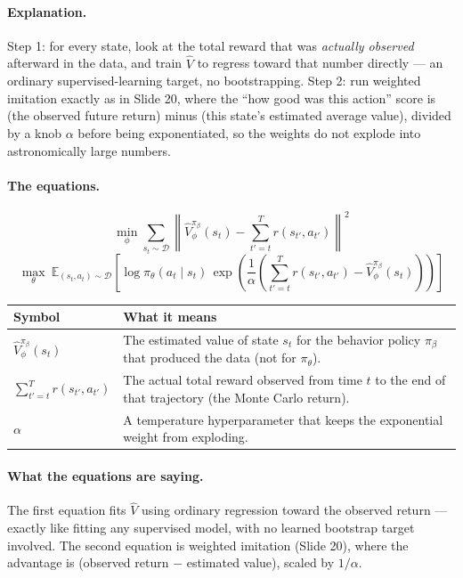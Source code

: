 \documentclass[11pt]{article}
\begin{document}
\paragraph{Explanation.}
Step 1: for every state, look at the total reward that was \emph{actually observed}
afterward in the data, and train $\hat V$ to regress toward that number directly --- an
ordinary supervised-learning target, no bootstrapping. Step 2: run weighted imitation
exactly as in Slide 20, where the ``how good was this action'' score is (the observed
future return) minus (this state's estimated average value), divided by a knob $\alpha$
before being exponentiated, so the weights do not explode into astronomically large
numbers.

\paragraph{The equations.}
$$\min_\phi \sum_{s_t\sim\mathcal{D}} \left\| \hat V_\phi^{\pi_\beta}(s_t) -
\sum_{t'=t}^{T} r(s_{t'},a_{t'})\right\|^2$$
$$\max_\theta\ \mathbb{E}_{(s_t,a_t)\sim\mathcal{D}}\left[\log \pi_\theta(a_t\mid s_t)\,
\exp\left(\frac{1}{\alpha}\left(\sum_{t'=t}^{T} r(s_{t'},a_{t'}) -
\hat V_\phi^{\pi_\beta}(s_t)\right)\right)\right]$$

\begin{center}
\begin{tabular}{@{}p{3.2cm}p{10.3cm}@{}}
\toprule
Symbol & What it means \\
\midrule
$\hat V_\phi^{\pi_\beta}(s_t)$ & The estimated value of state $s_t$ for the
behavior policy $\pi_\beta$ that produced the data (not for $\pi_\theta$). \\
$\sum_{t'=t}^T r(s_{t'},a_{t'})$ & The actual total reward observed from time $t$ to the
end of that trajectory (the Monte Carlo return). \\
$\alpha$ & A temperature hyperparameter that keeps the exponential weight from exploding. \\
\bottomrule
\end{tabular}
\end{center}

\paragraph{What the equations are saying.}
The first equation fits $\hat V$ using ordinary regression toward the observed return
--- exactly like fitting any supervised model, with no learned bootstrap target
involved. The second equation is weighted imitation (Slide 20), where the advantage is
(observed return $-$ estimated value), scaled by $1/\alpha$.
\end{document}
